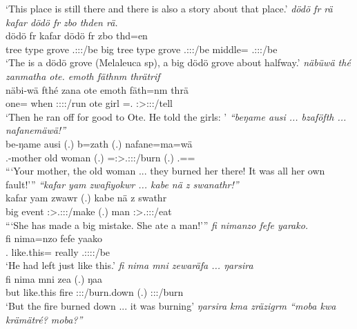 \begin{exe}
	\trans `This place is still there and there is also a story about that place.'
	\emph{dödö fr rä kafar dödö fr zbo thden rä.}\\
	\gll dödö fr  kafar dödö fr zbo thd=en \\
	{tree type} grove \Tsg.\F:\Sbj:\Nonpast:\Ipfv/be big {tree type} grove \Tsg.\F:\Sbj:\Nonpast:\Ipfv/be middle=\Loc{} \Tsg.\F:\Sbj:\Nonpast:\Ipfv/be\\
	\trans `The is a dödö grove (Melaleuca sp), a big dödö grove about halfway.'
	\emph{näbüwä thé zanmatha ote. emoth fäthnm thrätrif}\\
	\gll näbi-wä fthé zana ote emoth fäth=nm thrä\\
	one=\Emph{} when \Sg:\Sbj:\Pst:\Pfv:\Venit/run ote girl \Dim=\Dat.\Nsg{} \Stsg:\Sbj>\Stpl:\Io:\Irr:\Pfv/tell\\
	\trans `Then he ran off for good to Ote. He told the girls: '
	\emph{``beŋame ausi ... bzaföfth ... nafanemäwä!''}\\
	\gll be-ŋame ausi (.) b=zath (.) nafane=ma=wä\\
	\Snsg.\Poss-mother {old woman} (.) \Med=\Stpl:\Sbj>\Tsg.\F:\Obj:\Pst:\Pfv/burn (.) \Tsg.\Poss=\Char=\Emph{}\\
	\trans ```Your mother, the old woman ... they burned her there! It was all her own fault!'''
	\emph{``kafar yam zwafiyokwr ... kabe nä z swanathr!''}\\
	\gll kafar yam zwawr (.) kabe nä z swathr\\
	big event \Stsg:\Sbj>\Tsg.\F:\Obj:\Rpst:\Ipfv/make (.) man \Indf{} \Iam{} \Stsg:\Sbj>\Tsg.\Masc:\Obj:\Rpst:\Ipfv/eat\\
	\trans ```She has made a big mistake. She ate a man!'''
	\emph{fi nimanzo fefe yarako.}\\
	\gll fi nima=nzo fefe yaako\\
	\Third.\Abs{} {like.this}=\Only{} really \Tsg.\Masc:\Sbj:\Pst:\Ipfv:\Andat/be\\
	\trans `He had left just like this.'
	\emph{fi nima mni zewaräfa ... ŋarsira}\\
	\gll fi nima mni zea (.) ŋaa\\
	but {like.this} fire \Sg:\Sbj:\Pst:\Pfv/burn.down (.) \Sg:\Sbj:\Pst:\Ipfv/burn\\
	\trans `But the fire burned down ... it was burning'
	\emph{ŋarsira kma zräzigrm ``moba kwa krämätré? moba?''}\\

\end{exe}
